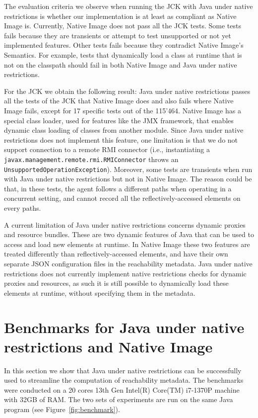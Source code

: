 The evaluation criteria we observe when running the JCK with Java under native restrictions is whether our implementation is at least as compliant as Native Image is. Currently, Native Image does not pass all the JCK tests. Some tests fails because they are transients or attempt to test unsupported or not yet implemented features. Other tests fails because they contradict Native Image's Semantics. For example, tests that dynamically load a class at runtime that is not on the classpath should fail in both Native Image and Java under native restrictions. 

For the JCK we obtain the following result: Java under native restrictions passes all the tests of the JCK that Native Image does and also fails where Native Image fails, except for 17 specific tests out of the 115'464. Native Image has a special class loader, used for features like the JMX framework, that enables dynamic class loading of classes from another module. Since Java under native restrictions does not implement this feature, one limitation is that we do not support connection to a remote RMI connector (i.e., instantiating a \verb|javax.management.remote.rmi.RMIConnector| throws an \verb|UnsupportedOperationException|). 
Moreover, some tests are transients when run with Java under native restrictions but not in Native Image. The reason could be that, in these tests, the agent follows a different paths when operating in a concurrent setting, and cannot record all the reflectively-accessed elements on every paths. 

A current limitation of Java under native restrictions concerns dynamic proxies and resource bundles. These are two dynamic features of Java that can be used to access and load new elements at runtime. In Native Image these two features are treated differently than reflectively-accessed elements, and have their own separate JSON configuration files in the reachability metadata. Java under native restrictions does not currently implement native restrictions checks for dynamic proxies and resources, as such it is still possible to dynamically load these elements at runtime, without specifying them in the metadata. 

\section{Benchmarks for Java under native restrictions and Native Image}\label{benchmark}
In this section we show that Java under native restrictions can be successfully used to streamline the computation of reachability metadata. The benchmarks were conducted on a 20 cores 13th Gen Intel(R) Core(TM) i7-1370P machine with 32GB of RAM. The two sets of experiments are run on the same Java program (see Figure~\ref{fig:benchmark}). 

